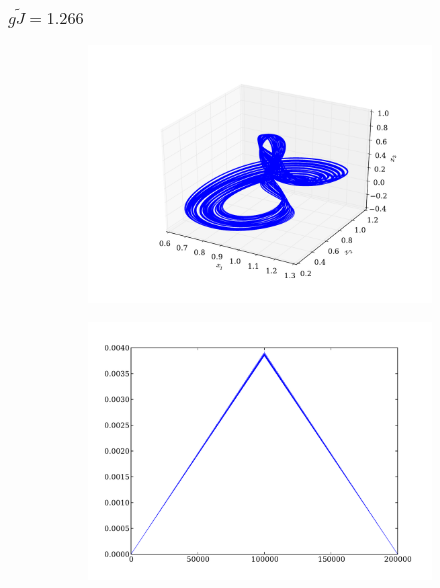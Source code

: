 \documentclass{beamer}
\begin{document}

\begin{frame}
\frametitle{$g\tilde{J} = 1.266$}
\begin{figure}
	\centering
	\begin{subfigure}[b]{0.49\textwidth}
		\includegraphics[width=\textwidth]{paulfigs/J_1_266_3d}
	\end{subfigure}
	\begin{subfigure}[b]{0.49\textwidth}
		\includegraphics[width=\textwidth]{paulfigs/tcorr_J_1_266}
	\end{subfigure}
\end{figure}
\end{frame}
\end{document}
